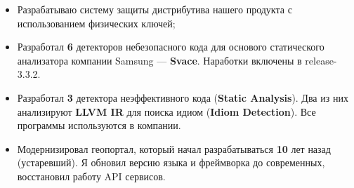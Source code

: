 \documentclass[10pt,a4paper,ragged2e,withhyper]{custom-altacv}
\begin{document}


\makecvheader



\begin{paracol}{2}


\begin{itemize}
	\item Разрабатываю систему защиты дистрибутива нашего продукта с использованием физических ключей;
	\item Разработал \textbf{6} детекторов небезопасного кода для основого статического анализатора компании Samsung --- \textbf{Svace}. Наработки включены в release-3.3.2.
\end{itemize}

\divider


\begin{itemize}
	\item Разработал \textbf{3} детектора неэффективного кода (\textbf{Static Analysis}). Два из них анализируют \textbf{LLVM IR} для поиска идиом (\textbf{Idiom Detection}). Все программы используются в компании.
\end{itemize}

\divider


\begin{itemize}
	\item Модернизировал геопортал, который начал разрабатываться \textbf{10} лет назад (устаревший). Я обновил версию языка и фреймворка до современных, восстановил работу API сервисов.
\end{itemize}




\end{paracol}
\end{document}
